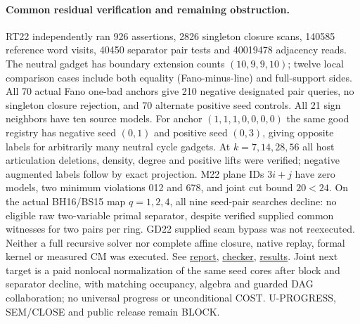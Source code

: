 \documentclass[11pt]{article}
\begin{document}
\paragraph{Common residual verification and remaining obstruction.}
RT22 independently ran 926 assertions, 2826 singleton closure scans, 140585 reference word visits, 40450 separator pair tests and 40019478 adjacency reads. The neutral gadget has boundary extension counts $(10,9,9,10)$; twelve local comparison cases include both equality (Fano-minus-line) and full-support sides. All 70 actual Fano one-bad anchors give 210 negative designated pair queries, no singleton closure rejection, and 70 alternate positive seed controls. All 21 sign neighbors have ten source models. For anchor $(1,1,1,0,0,0,0)$ the same good registry has negative seed $(0,1)$ and positive seed $(0,3)$, giving opposite labels for arbitrarily many neutral cycle gadgets. At $k=7,14,28,56$ all host articulation deletions, density, degree and positive lifts were verified; negative augmented labels follow by exact projection. M22 plane IDs $3i+j$ have zero models, two minimum violations 012 and 678, and joint cut bound $20<24$. On the actual BH16/BS15 map $q=1,2,4$, all nine seed-pair searches decline: no eligible raw two-variable primal separator, despite verified supplied common witnesses for two pairs per ring. GD22 supplied seam bypass was not reexecuted. Neither a full recursive solver nor complete affine closure, native replay, formal kernel or measured CM was executed. See \href{https://github.com/j15marti/pnp/commit/19aa720dccd0836645d00e98b3d11baa1275fa37}{report}, \href{https://github.com/j15marti/pnp/commit/5e67d3bbc7b6d14973ba4bce45301c852386b4e9}{checker}, \href{https://github.com/j15marti/pnp/commit/1fd4721911450c8afaf6b3a95f8935a5137b376f}{results}. Joint next target is a paid nonlocal normalization of the same seed cores after block and separator decline, with matching occupancy, algebra and guarded DAG collaboration; no universal progress or unconditional COST. U-PROGRESS, SEM/CLOSE and public release remain BLOCK.
\end{document}
